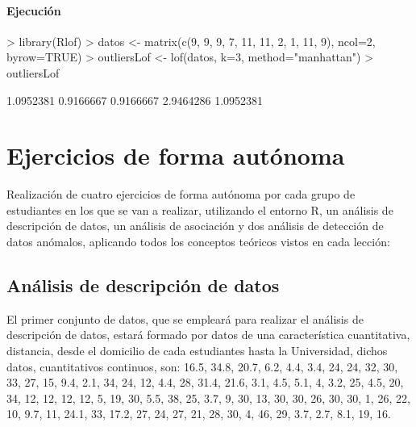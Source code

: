 \documentclass[a4paper, 12pt]{article}
\begin{document}
	\paragraph{Ejecución}
\begin{Schunk}
\begin{Sinput}
> library(Rlof)
> datos <- matrix(c(9, 9, 9, 7, 11, 11, 2, 1, 11, 9), ncol=2, byrow=TRUE)
> outliersLof <- lof(datos, k=3, method="manhattan")
> outliersLof
\end{Sinput}
\begin{Soutput}
[1] 1.0952381 0.9166667 0.9166667 2.9464286 1.0952381
\end{Soutput}
\end{Schunk}
	

	\section{Ejercicios de forma autónoma}
	Realización de cuatro ejercicios de forma autónoma por cada grupo de estudiantes en los que se van a realizar, utilizando el entorno R, un análisis de descripción de datos, un análisis de asociación y dos análisis de detección de datos anómalos, aplicando todos los conceptos teóricos vistos en cada lección:
	
	\subsection{Análisis de descripción de datos}
	El primer conjunto de datos, que se empleará para realizar el análisis de descripción de datos, estará formado por datos de una característica cuantitativa, distancia, desde el domicilio de cada estudiantes hasta la Universidad, dichos datos, cuantitativos continuos, son: 16.5, 34.8, 20.7, 6.2, 4.4, 3.4, 24, 24, 32, 30, 33, 27, 15, 9.4, 2.1, 34, 24, 12, 4.4, 28, 31.4, 21.6, 3.1, 4.5, 5.1, 4, 3.2, 25, 4.5, 20, 34, 12, 12, 12, 12, 5, 19, 30, 5.5, 38, 25, 3.7, 9, 30, 13, 30, 30, 26, 30, 30, 1, 26, 22, 10, 9.7, 11, 24.1, 33, 17.2, 27, 24, 27, 21, 28, 30, 4, 46, 29, 3.7, 2.7, 8.1, 19, 16.
\end{document}
